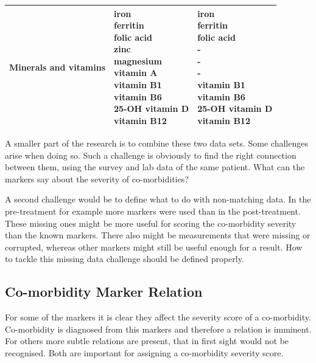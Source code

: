 \documentclass[10pt,a4paper]{article}
\begin{document}
\begin{table}
\begin{tabular}{lll}
			Minerals and vitamins & \makecell{iron\\ferritin\\folic acid\\zinc\\magnesium\\vitamin A\\vitamin B1\\vitamin B6\\25-OH vitamin D\\vitamin B12}                                        & \makecell{iron\\ferritin\\folic acid\\-\\-\\-\\vitamin B1\\vitamin B6\\25-OH vitamin D\\vitamin B12}                                                           \\ \hline
		\end{tabular}
	\end{table}
	
	A smaller part of the research is to combine these two data sets. Some challenges arise when doing so. Such a challenge is obviously to find the right connection between them, using the survey and lab data of the same patient. What can the markers say about the severity of co-morbidities?
	
	A second challenge would be to define what to do with non-matching data. In the pre-treatment for example more markers were used than in the post-treatment. These missing ones might be more useful for scoring the co-morbidity severity than the known markers. There also might be measurements that were missing or corrupted, whereas other markers might still be useful enough for a result. How to tackle this missing data challenge should be defined properly.
	
	\subsection{Co-morbidity Marker Relation}
	\label{subsec:CoMorMarkRel}
		
	For some of the markers it is clear they affect the severity score of a co-morbidity. Co-morbidity is diagnosed from this markers and therefore a relation is imminent. For others more subtle relations are present, that in first sight would not be recognised. Both are important for assigning a co-morbidity severity score.
	
\end{document}

